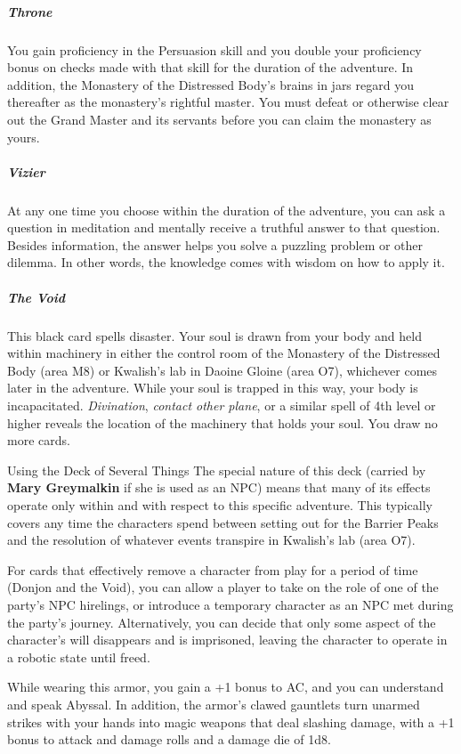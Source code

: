 \documentclass[10pt,a4paper,twoside,bg=print,twocolumn,openany,nodeprecatedcode]{dndbook}
\begin{document}
\subparagraph{Throne}
You gain proficiency in the Persuasion skill and you double your proficiency bonus on checks made with that skill for the duration of the adventure. In addition, the Monastery of the Distressed Body's brains in jars regard you thereafter as the monastery's rightful master. You must defeat or otherwise clear out the Grand Master and its servants before you can claim the monastery as yours.

\subparagraph{Vizier}
At any one time you choose within the duration of the adventure, you can ask a question in meditation and mentally receive a truthful answer to that question. Besides information, the answer helps you solve a puzzling problem or other dilemma. In other words, the knowledge comes with wisdom on how to apply it.

\subparagraph{The Void}
This black card spells disaster. Your soul is drawn from your body and held within machinery in either the control room of the Monastery of the Distressed Body (area M8) or Kwalish's lab in Daoine Gloine (area O7), whichever comes later in the adventure. While your soul is trapped in this way, your body is incapacitated. \textit{Divination}, \textit{contact other plane}, or a similar spell of 4th level or higher reveals the location of the machinery that holds your soul. You draw no more cards.

\begin{DndSidebar}[float=!b]{Using the Deck of Several Things}
The special nature of this deck (carried by \textbf{Mary Greymalkin} if she is used as an NPC) means that many of its effects operate only within and with respect to this specific adventure. This typically covers any time the characters spend between setting out for the Barrier Peaks and the resolution of whatever events transpire in Kwalish's lab (area O7).



For cards that effectively remove a character from play for a period of time (Donjon and the Void), you can allow a player to take on the role of one of the party's NPC hirelings, or introduce a temporary character as an NPC met during the party's journey. Alternatively, you can decide that only some aspect of the character's will disappears and is imprisoned, leaving the character to operate in a robotic state until freed.



\end{DndSidebar}

While wearing this armor, you gain a +1 bonus to AC, and you can understand and speak Abyssal. In addition, the armor's clawed gauntlets turn unarmed strikes with your hands into magic weapons that deal slashing damage, with a +1 bonus to attack and damage rolls and a damage die of 1d8.
\end{document}
